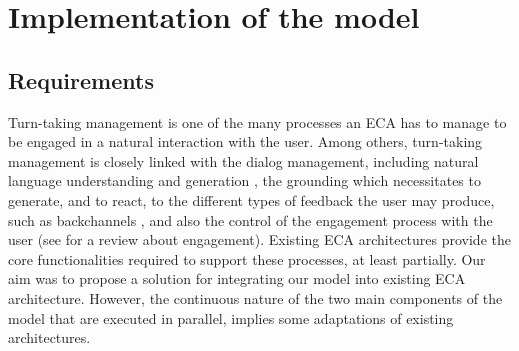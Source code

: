 \section{Implementation of the model}
\label{impl}


\subsection{Requirements}

Turn-taking management is one of the many processes an ECA has to manage to be engaged in a natural interaction with the user. 
Among others, turn-taking management is closely linked with 
the dialog management, including natural language understanding and generation \citep{skantze_towards_2010}, 
the grounding which necessitates to generate, and to react, to the different types of feedback the user may produce, such as backchannels \citep{kopp_dynamic_2014,bevacqua_multimodal_2010}, 
and also the control of the engagement process with the user (see \cite{clavel_fostering_2016} for a review about engagement). 
Existing ECA architectures provide the core functionalities required to support these processes, at least partially. 
Our aim was to propose a solution for integrating our model into existing ECA architecture.
However, the continuous nature of the two main components of the model that are executed in parallel, implies some adaptations of existing architectures. 



